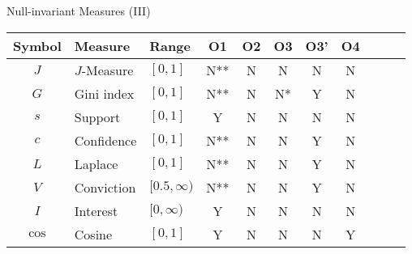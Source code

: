 \begin{frame}{Null-invariant Measures (III)}
	\centering
	\begin{tabular}{|c|l|l|c|c|c|c|c|c|c|c|}
		\hline
		\textbf{Symbol}      & \textbf{Measure}        & \textbf{Range} &
		\textbf{O1}          & \textbf{O2}             & \textbf{O3}    & \textbf{O3'} &
		\textbf{O4}                                                                               \\\hline
		$J$                  & $J$-Measure             & $[0,1]$        & N**          & N & N  &
		N                    &
		N                                                                                         \\
		$G$                  & Gini index              & $[0,1]$        & N**          & N & N* &
		Y                    &
		N                                                                                         \\
		$s$                  & Support                 & $[0,1]$        & Y            & N & N  &
		N                    &
		N                                                                                         \\
		{\color{red}$c$}     & {\color{red}Confidence} &
		{\color{red}$[0,1]$} & {\color{red}N**}        & {\color{red}N} &
		{\color{red}N}       & {\color{red}Y}          & {\color{red}N}                           \\
		$L$                  & Laplace                 & $[0,1]$        & N**          & N & N  &
		Y                    &
		N                                                                                         \\
		$V$                  & Conviction              & $[0.5,\infty)$ & N**          & N & N  &
		Y                    &
		N                                                                                         \\
		$I$                  & Interest                & $[0,\infty)$   & Y            & N & N  &
		N                    &
		N                                                                                         \\
		{\color{red}$\cos$}  & {\color{red}Cosine}     &
		{\color{red}$[0,1]$} & {\color{red}Y}          & {\color{red}N} &
		{\color{red}N}       & {\color{red}N}          & {\color{red}Y}                           \\\hline
	\end{tabular}
\end{frame}

